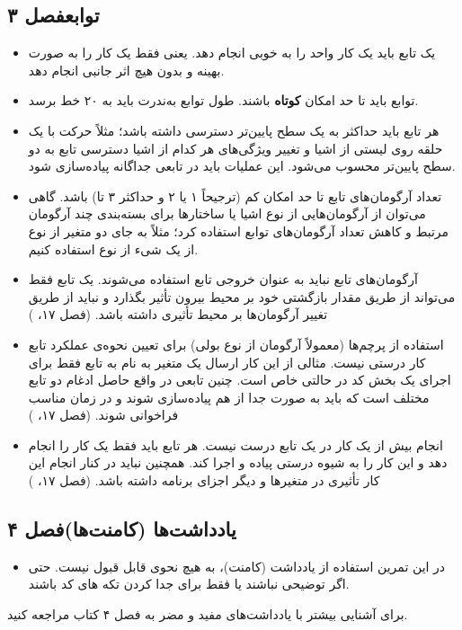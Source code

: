 \documentclass{utap}
\newcommand{\chap}[1]{\hfill\normalfont\normalsize فصل #1}
\begin{document}
\subsection[توابع]{توابع\chap{۳}}
  \begin{itemize}
	\item
یک تابع باید یک کار واحد را به خوبی انجام دهد. یعنی فقط یک کار را به صورت بهینه و بدون هیچ اثر جانبی انجام دهد.
    \item
توابع باید تا حد امکان \textbf{کوتاه} باشند.
طول توابع به‌ندرت باید به ۲۰ خط برسد.
	\item
هر تابع باید حداکثر به یک سطح پایین‌تر دسترسی داشته باشد؛ مثلاً حرکت با یک حلقه روی لیستی از اشیا و تغییر ویژگی‌های هر کدام از اشیا دسترسی تابع به دو سطح پایین‌تر محسوب می‌شود. این عملیات باید در تابعی جداگانه پیاده‌سازی شود.
	\item
تعداد آرگومان‌های تابع تا حد امکان کم (ترجیحاً ۱ یا ۲ و حداکثر ۳ تا) باشد.
گاهی می‌توان از آرگومان‌هایی از نوع اشیا یا ساختارها برای بسته‌بندی چند آرگومان مرتبط و کاهش تعداد آرگومان‌های توابع استفاده کرد؛ مثلاً به جای دو متغیر از نوع  از یک شیء از نوع  استفاده کنیم.
    \item
آرگومان‌های تابع نباید به عنوان خروجی تابع استفاده می‌شوند.
یک تابع فقط می‌تواند از طریق مقدار بازگشتی خود بر محیط بیرون تأثیر بگذارد و نباید از طریق تغییر آرگومان‌ها بر محیط تأثیری داشته باشد. (فصل ۱۷، )
    \item
استفاده از پرچم‌ها (معمولاً آرگومان از نوع بولی) برای تعیین نحوه‌ی عملکرد تابع کار درستی نیست.
مثالی از این کار ارسال یک متغیر به نام  به تابع فقط برای اجرای یک بخش کد در حالتی خاص است. چنین تابعی در واقع حاصل ادغام دو تابع مختلف است که باید به صورت جدا از هم پیاده‌سازی شوند و در زمان مناسب فراخوانی شوند. (فصل ۱۷، )
    \item
انجام بیش از یک کار در یک تابع درست نیست. هر تابع باید فقط یک کار را انجام دهد و این کار را به شیوه درستی پیاده و اجرا کند. همچنین نباید در کنار انجام این کار تأثیری در متغیرها و دیگر اجزای برنامه داشته باشد. (فصل ۱۷، )
    \end{itemize}

\subsection[یادداشت‌ها]{یادداشت‌ها (کامنت‌ها)\chap{۴}}
	  \begin{itemize}
	        \item
در این تمرین استفاده از یادداشت (کامنت)، به هیچ نحوی قابل قبول نیست. حتی اگر توضیحی نباشند یا فقط برای جدا کردن تکه های کد باشند.
	    \end{itemize}
برای آشنایی بیشتر با یادداشت‌های مفید و مضر به فصل ۴ کتاب مراجعه کنید.
\end{document}
